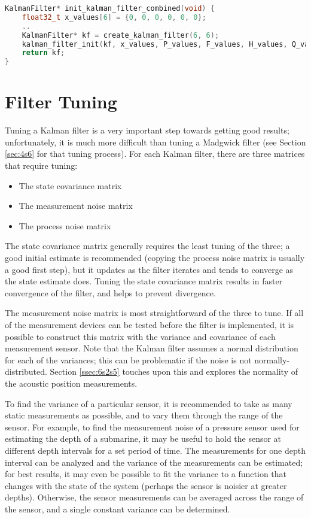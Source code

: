 \documentclass[11pt]{ucthesisCP}
\begin{document}
\begin{lstlisting}[language=C++]
KalmanFilter* init_kalman_filter_combined(void) {
	float32_t x_values[6] = {0, 0, 0, 0, 0, 0};
	..
	KalmanFilter* kf = create_kalman_filter(6, 6);
	kalman_filter_init(kf, x_values, P_values, F_values, H_values, Q_values, R_values);
	return kf;
}
\end{lstlisting}

\section{Filter Tuning} \label{sec:5s5}
Tuning a Kalman filter is a very important step towards getting good results; unfortunately, it is much more difficult than tuning a Madgwick filter (see Section \ref{sec:4s6} for that tuning process). For each Kalman filter, there are three matrices that require tuning:
\begin{itemize}[noitemsep,topsep=0pt,]
	\item The state covariance matrix
	\item The measurement noise matrix
	\item The process noise matrix
\end{itemize}

The state covariance matrix generally requires the least tuning of the three; a good initial estimate is recommended (copying the process noise matrix is usually a good first step), but it updates as the filter iterates and tends to converge as the state estimate does. Tuning the state covariance matrix results in faster convergence of the filter, and helps to prevent divergence.

The measurement noise matrix is most straightforward of the three to tune. If all of the measurement devices can be tested before the filter is implemented, it is possible to construct this matrix with the variance and covariance of each measurement sensor. Note that the Kalman filter assumes a normal distribution for each of the variances; this can be problematic if the noise is not normally-distributed. Section \ref{ssec:6s2s5} touches upon this and explores the normality of the acoustic position measurements. 

To find the variance of a particular sensor, it is recommended to take as many static measurements as possible, and to vary them through the range of the sensor. For example, to find the measurement noise of a pressure sensor used for estimating the depth of a submarine, it may be useful to hold the sensor at different depth intervals for a set period of time. The measurements for one depth interval can be analyzed and the variance of the measurements can be estimated; for best results, it may even be possible to fit the variance to a function that changes with the state of the system (perhaps the sensor is noisier at greater depths). Otherwise, the sensor measurements can be averaged across the range of the sensor, and a single constant variance can be determined.
\end{document}
